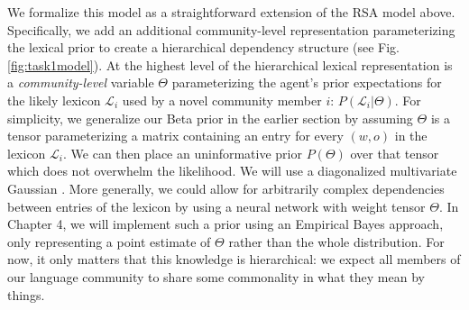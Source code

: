 We formalize this model as a straightforward extension of the RSA model above.
Specifically, we add an additional community-level representation parameterizing the lexical prior to create a hierarchical dependency structure (see Fig. \ref{fig:task1model}). 
At the highest level of the hierarchical lexical representation is a \emph{community-level} variable $\Theta$ parameterizing the agent's prior expectations for the likely lexicon $\mathcal{L}_i$ used by a novel community member $i$: $P(\mathcal{L}_i | \Theta)$. 
For simplicity, we generalize our Beta prior in the earlier section by assuming $\Theta$ is a tensor parameterizing a matrix containing an entry for every $(w,o)$ in the lexicon $\mathcal{L}_i$.  
We can then place an uninformative prior $P(\Theta)$ over that tensor which does not overwhelm the likelihood.
We will use a diagonalized multivariate Gaussian \cite<but see>[p. 110, for other reasonable choices]{gelman_bayesian_2014}. 
More generally, we could allow for arbitrarily complex dependencies between entries of the lexicon by using a neural network with weight tensor $\Theta$.
In Chapter 4, we will implement such a prior using an Empirical Bayes approach, only representing a point estimate of $\Theta$ rather than the whole distribution.
For now, it only matters that this knowledge is hierarchical: we expect all members of our language community to share some commonality in what they mean by things. 

